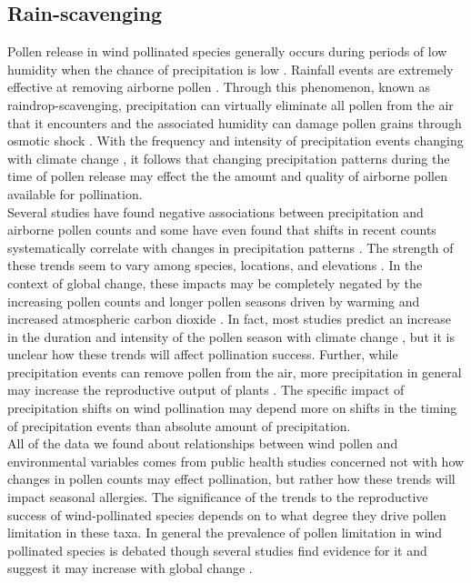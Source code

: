\documentclass[11pt]{article}
\begin{document}
\subsection*{Rain-scavenging}
\noindent Pollen release in wind pollinated species generally occurs during periods of low humidity when the chance of precipitation is low \citep{Niklas1985, Whitehead1969}. Rainfall events are extremely effective at removing airborne pollen \citep{Kluska:2020aa}. Through this phenomenon, known as raindrop-scavenging,  precipitation can virtually eliminate all pollen from the air that it encounters and the associated humidity can damage pollen grains through osmotic shock \citep{Niklas1985}. With the frequency and intensity of precipitation events changing with climate change \citep{IPCC2013}, it follows that changing precipitation patterns during the time of pollen release may effect the the amount and quality of airborne pollen available for pollination.\\

\noindent Several studies have found negative associations between precipitation and airborne pollen counts \citep{Grewling:2014aa,Gross2019,Pace:2018aa} and some have even found that shifts in recent counts systematically correlate with changes in precipitation patterns \citep{Zhang:2015, Bruffaerts:2018aa}. The strength of these trends seem to vary among species, locations, and elevations \citep{Knaap:2010aa,Pace:2018aa}. In the context of global change, these impacts may be completely negated by the increasing pollen counts and longer pollen seasons driven by warming \citep{Gross2019} and increased atmospheric carbon dioxide \citep{Ziska:2000aa}. In fact, most studies predict an increase in the duration and intensity of the pollen season with climate change \citep{Ziello:2012aa,Zhang:2015}, but it is unclear how these trends will affect pollination success. Further, while precipitation events can remove pollen from the air, more precipitation in general may increase the reproductive output of plants \citep{Fernandez-Martinez:2012aa}. The specific impact of precipitation shifts on wind pollination may depend more on shifts in the timing of precipitation events than absolute amount of precipitation. \\ %

\noindent All of the data we found about relationships between wind pollen and environmental variables comes from public health studies concerned not with how changes in pollen counts may effect pollination, but rather how these trends will impact seasonal allergies. The significance of the trends to the reproductive success of wind-pollinated species depends on to what degree they drive pollen limitation in these taxa. In general the prevalence of pollen limitation in wind pollinated species is debated \citep{Friedman:2009aa} though several studies find evidence for it \citep{Koenig:2012aa} and suggest it may increase with global change \citep{Koenig:2003aa,Knapp:2001aa}.\\
\end{document}
